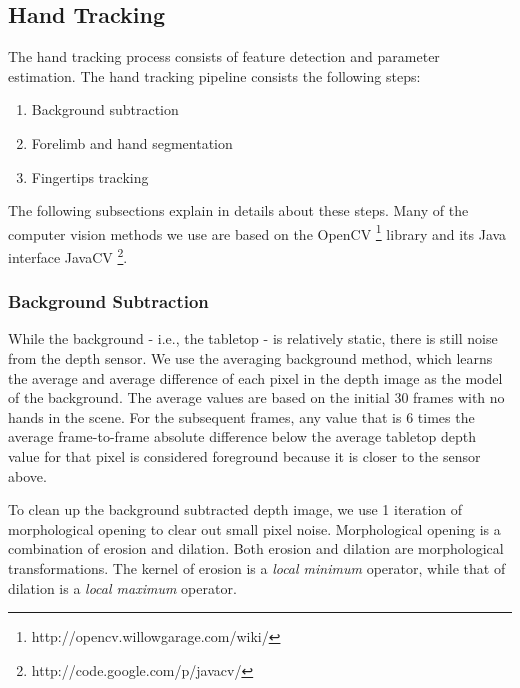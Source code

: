\subsection{Hand Tracking}
The hand tracking process consists of feature detection and parameter estimation. The hand tracking
pipeline consists the following steps:

\begin{enumerate}
  \item Background subtraction
  \item Forelimb and hand segmentation
  \item Fingertips tracking
\end{enumerate}

The following subsections explain in details about these steps. Many of the
computer vision methods we use are based on the OpenCV
\footnote{http://opencv.willowgarage.com/wiki/} library and its Java interface 
JavaCV \footnote{http://code.google.com/p/javacv/}.

\subsubsection{Background Subtraction}
While the background - i.e., the tabletop - is relatively static, there is
still noise from the depth sensor. We use the averaging background method, which
learns the average and average difference of each pixel in the depth image as
the model of the background. The average values are based on the initial 30
frames with no hands in the scene. For the subsequent frames, any value that is 
6 times the average frame-to-frame absolute difference below the average tabletop depth value for that pixel is considered 
foreground because it is closer to the sensor above.

To clean up the background subtracted depth image, we use 1 iteration of
morphological opening to clear out small pixel noise. Morphological opening is a
combination of erosion and dilation. Both erosion and dilation are morphological
transformations. The kernel of erosion is a \textit{local minimum} operator,
while that of dilation is a \textit{local maximum} operator.

